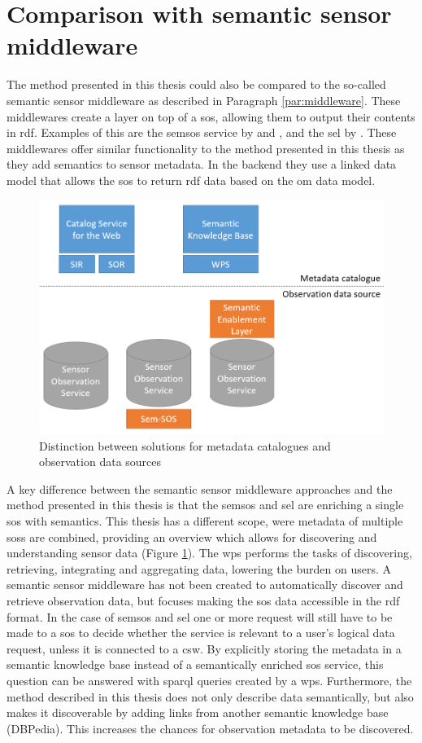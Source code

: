 \section{Comparison with semantic sensor middleware}
The method presented in this thesis could also be compared to the so-called semantic sensor middleware as described in Paragraph \ref{par:middleware}. These middlewares create a layer on top of a \ac{sos}, allowing them to output their contents in \ac{rdf}. Examples of this are the \acf{semsos} service by \cite{SSW:Henson} and \cite{SSW:Pschorr}, and the \acf{sel} by \cite{SSW:Janowicz}. These middlewares offer similar functionality to the method presented in this thesis as they add semantics to sensor metadata. In the backend they use a linked data model that allows the \ac{sos} to return \ac{rdf} data based on the \ac{om} data model. 

\begin{figure}
	\centering
	\includegraphics[width=0.8\linewidth]{figs/catalogVSsource.PNG}
	\caption{Distinction between solutions for metadata catalogues and observation data sources}
	\label{fig:catVSsource}
\end{figure}

A key difference between the semantic sensor middleware approaches and the method presented in this thesis is that the \ac{semsos} and \ac{sel} are enriching a single \ac{sos} with semantics. This thesis has a different scope, were metadata of multiple \aclp{sos} are combined, providing an overview which allows for discovering and understanding sensor data (Figure \ref{fig:catVSsource}). The \ac{wps} performs the tasks of discovering, retrieving, integrating and aggregating data, lowering the burden on users. A semantic sensor middleware has not been created to automatically discover and retrieve observation data, but focuses making the \ac{sos} data accessible in the \ac{rdf} format. In the case of \ac{semsos} and \ac{sel} one or more request will still have to be made to a \ac{sos} to decide whether the service is relevant to a user's logical data request, unless it is connected to a \ac{csw}. By explicitly storing the metadata in a semantic knowledge base instead of a semantically enriched \ac{sos} service, this question can be answered with \ac{sparql} queries created by a \ac{wps}. Furthermore, the method described in this thesis does not only describe data semantically, but also makes it discoverable by adding links from another semantic knowledge base (DBPedia). This increases the chances for observation metadata to be discovered.        

